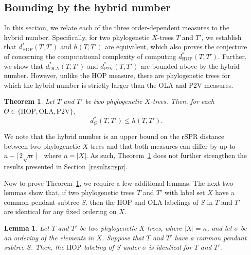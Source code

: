 \documentclass{article}
\newtheorem{lemma}{Lemma}
\newtheorem{theorem}{Theorem}
\newcommand{\HOP}{\mathrm{HOP}}
\newcommand{\OLA}{\mathrm{OLA}}
\newcommand{\PV}{\mathrm{P2V}}
\begin{document}
\subsection{Bounding by the hybrid number}
\label{results:hybrid}

In this section, we relate each of the three order-dependent measures to the hybrid number. Specifically, for two phylogenetic $X$-trees $T$ and $T'$, we establish that $d^*_\HOP(T,T')$ and $h(T,T')$ are equivalent, which also proves the conjecture of \cite[Remark~3, p.~9]{hop} concerning the computational complexity of computing $d^*_\HOP(T,T')$. Further, we show that $d^*_\OLA(T,T')$ and  $d^*_\PV(T,T')$ are bounded above by the hybrid number. However, unlike the HOP measure, there are phylogenetic trees for which the hybrid number is strictly larger than the  OLA and P2V measures.

\begin{theorem}\label{thm:hybrid-upper-bound}
Let $T$ and $T'$ be two  phylogenetic $X$-trees. Then, for each $\Theta\in\{\HOP,\OLA,\PV\}$,
$$d^*_\Theta(T, T')\le h(T, T').$$
\end{theorem}

We note that the hybrid number is an upper bound on the rSPR distance between two phylogenetic $X$-trees and that both measures can differ by up to $n-\lceil 2\sqrt n\,\rceil$~\cite{humphries2009note} where $n = |X|$.  As such, Theorem~\ref{thm:hybrid-upper-bound} does not further strengthen the results presented in Section~\ref{results:rspr}.

Now to prove Theorem~\ref{thm:hybrid-upper-bound}, we require a few additional lemmas. 
The next two lemmas show that, if two phylogenetic trees $T$ and $T'$ with label set $X$ have a common pendant subtree $S$, then the HOP and OLA labelings of $S$ in $T$ and $T'$ are identical for any fixed ordering on $X$.

\begin{lemma}
Let $T$ and $T'$ be two phylogenetic $X$-trees, where $|X|=n$, and let $\sigma$ be an ordering of the elements in $X$. Suppose that $T$ and $T'$ have a common pendant subtree $S$. Then, the $\HOP$ labeling of $S$ under $\sigma$ is identical for $T$ and $T'$.
\label{lem:subtree-labeling1}
\end{lemma}
\end{document}
